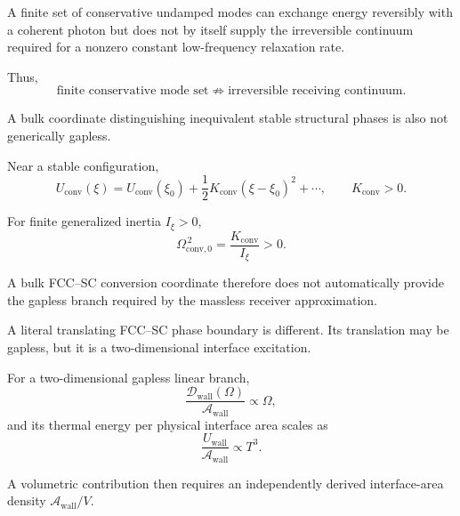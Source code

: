 A finite set of conservative undamped modes can exchange energy reversibly
with a coherent photon but does not by itself supply the irreversible
continuum required for a nonzero constant low-frequency relaxation rate.

Thus,
\begin{equation}
    \text{finite conservative mode set}
    \not\Rightarrow
    \text{irreversible receiving continuum}.
    \label{eq:AT_constraint_finite_receiver}
\end{equation}

A bulk coordinate distinguishing inequivalent stable structural phases is
also not generically gapless.

Near a stable configuration,
\begin{equation}
    U_{\mathrm{conv}}(\xi)
    =
    U_{\mathrm{conv}}(\xi_0)
    +
    \frac{1}{2}
    K_{\mathrm{conv}}
    \left(
        \xi-\xi_0
    \right)^2
    +
    \cdots,
    \qquad
    K_{\mathrm{conv}}>0.
    \label{eq:AT_conversion_potential}
\end{equation}

For finite generalized inertia
\(I_\xi>0\),
\begin{equation}
    \Omega_{\mathrm{conv},0}^{\,2}
    =
    \frac{
        K_{\mathrm{conv}}
    }{
        I_\xi
    }
    >
    0.
    \label{eq:AT_conversion_gap}
\end{equation}

A bulk FCC--SC conversion coordinate therefore does not automatically provide
the gapless branch required by the massless receiver approximation.

A literal translating FCC--SC phase boundary is different. Its translation
may be gapless, but it is a two-dimensional interface excitation.

For a two-dimensional gapless linear branch,
\begin{equation}
    \frac{
        \mathcal D_{\mathrm{wall}}(\Omega)
    }{
        \mathcal A_{\mathrm{wall}}
    }
    \propto
    \Omega,
\end{equation}
and its thermal energy per physical interface area scales as
\begin{equation}
    \frac{
        U_{\mathrm{wall}}
    }{
        \mathcal A_{\mathrm{wall}}
    }
    \propto
    T^3.
    \label{eq:AT_wall_thermal_scaling}
\end{equation}

A volumetric contribution then requires an independently derived
interface-area density
\(
\mathcal A_{\mathrm{wall}}/V
\).

